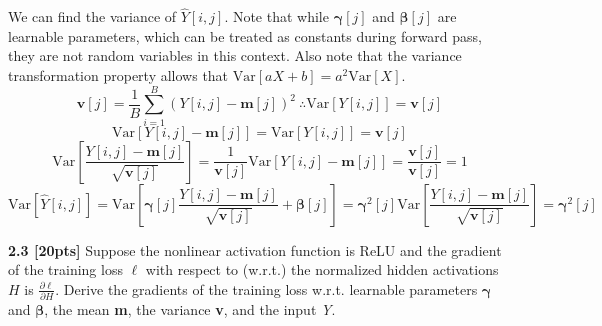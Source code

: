 \documentclass{article}
\begin{document}
{We can find the variance of $\hat{Y}[i,j]$. Note that while $\boldsymbol{\gamma}[j]$ and $\boldsymbol{\beta}[j]$ are learnable parameters, which can be treated as constants during forward pass, they are not random variables in this context. Also note that the variance transformation property allows that $\text{Var}[aX+ b]= a^2 \text{Var}[X]$.
\begin{equation}
    \textbf{v}[j]=\frac{1}{B}\sum_{i=1}^{B} (Y[i,j]-\textbf{m}[j])^{2} \ \therefore \text{Var}[Y[i,j]]=\textbf{v}[j]
\end{equation}
\begin{equation}
    \text{Var}[Y[i,j]- \textbf{m}[j]]= \text{Var}[Y[i,j]]= \textbf{v}[j]
\end{equation}
\begin{equation}
    \text{Var}\left[\frac{Y[i,j]- \textbf{m}[j]}{\sqrt{\textbf{v}[j]}}\right]= \frac{1}{\textbf{v}[j]} \text{Var}[Y[i,j]- \textbf{m}[j]]= \frac{\textbf{v}[j]}{\textbf{v}[j]}= 1
\end{equation}
\begin{equation}
    \text{Var}[\hat{Y}[i,j]]= \text{Var}\left[\boldsymbol{\gamma}[j] \frac{Y[i,j]- \textbf{m}[j]}{\sqrt{\textbf{v}[j]}}+ \boldsymbol{\beta}[j]\right]= \boldsymbol{\gamma}^2[j] \text{Var}\left[\frac{Y[i,j]- \textbf{m}[j]}{\sqrt{\textbf{v}[j]}}\right]= \boldsymbol{\gamma}^2[j]
\end{equation}
}

\noindent
\textbf{2.3 [20pts]} Suppose the nonlinear activation function is ReLU and the gradient of the training
loss $\ell$ with respect to (w.r.t.) the normalized hidden activations $H$ is $\frac{\partial \ell}{\partial H}$. Derive the gradients of the training loss w.r.t. learnable parameters $\boldsymbol{\gamma}$ and $\boldsymbol{\beta}$, the mean \textbf{m}, the variance \textbf{v}, and the input \textit{Y}.\\
\end{document}
